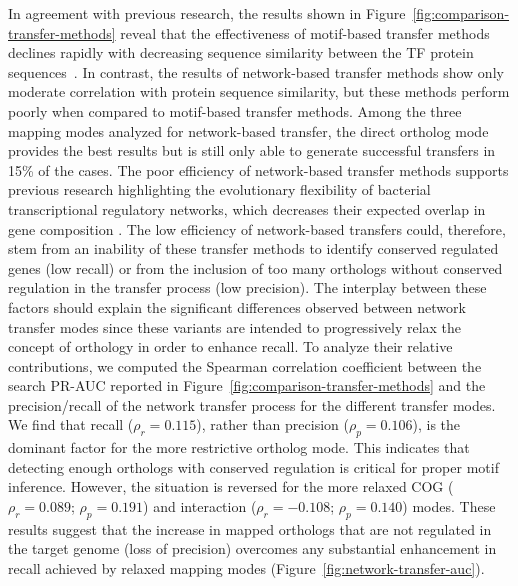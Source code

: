 In agreement with previous research, the results shown in
Figure~\ref{fig:comparison-transfer-methods} reveal that the effectiveness of
motif-based transfer methods declines rapidly with decreasing sequence
similarity between the TF protein sequences~\citep{yu2004annotation}. In
contrast, the results of network-based transfer methods show only moderate
correlation with protein sequence similarity, but these methods perform poorly
when compared to motif-based transfer methods. Among the three mapping modes
analyzed for network-based transfer, the direct ortholog mode provides the best
results but is still only able to generate successful transfers in 15\% of the
cases. The poor efficiency of network-based transfer methods supports previous
research highlighting the evolutionary flexibility of bacterial transcriptional
regulatory networks, which decreases their expected overlap in gene composition
\citep{venancio2009reconstructing, babu2006evolutionary, chavez2006bacterial,
  price2007orthologous}. The low efficiency of network-based transfers could,
therefore, stem from an inability of these transfer methods to identify
conserved regulated genes (low recall) or from the inclusion of too many
orthologs without conserved regulation in the transfer process (low
precision). The interplay between these factors should explain the significant
differences observed between network transfer modes since these variants are
intended to progressively relax the concept of orthology in order to enhance
recall. To analyze their relative contributions, we computed the Spearman
correlation coefficient between the search PR-AUC reported in
Figure~\ref{fig:comparison-transfer-methods} and the precision/recall of the
network transfer process for the different transfer modes. We find that recall
($\rho_r=0.115$), rather than precision ($\rho_p=0.106$), is the dominant
factor for the more restrictive ortholog mode. This indicates that detecting
enough orthologs with conserved regulation is critical for proper motif
inference. However, the situation is reversed for the more relaxed COG
($\rho_r=0.089$; $\rho_p =0.191$) and interaction ($\rho_r=-0.108$;
$\rho_p=0.140$) modes. These results suggest that the increase in mapped
orthologs that are not regulated in the target genome (loss of precision)
overcomes any substantial enhancement in recall achieved by relaxed mapping
modes (Figure~\ref{fig:network-transfer-auc}).

